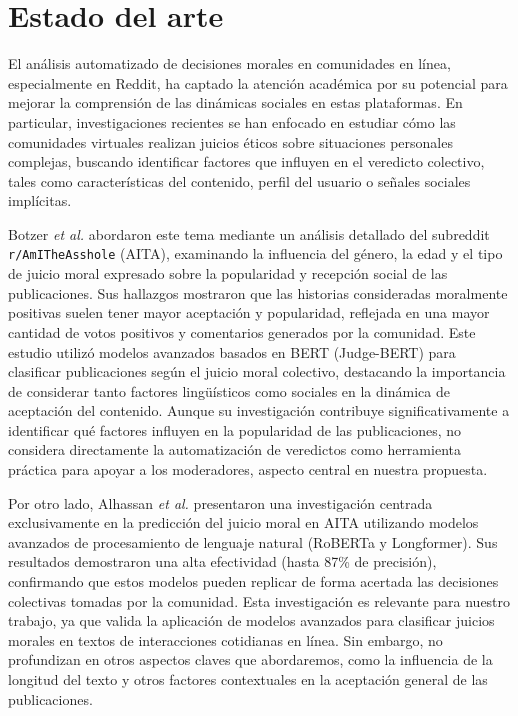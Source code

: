 \section{Estado del arte}

El análisis automatizado de decisiones morales en comunidades en línea, especialmente en Reddit, ha captado la atención académica por su potencial para mejorar la comprensión de las dinámicas sociales en estas plataformas. En particular, investigaciones recientes se han enfocado en estudiar cómo las comunidades virtuales realizan juicios éticos sobre situaciones personales complejas, buscando identificar factores que influyen en el veredicto colectivo, tales como características del contenido, perfil del usuario o señales sociales implícitas.

Botzer \textit{et al.} \cite{botzer2023} abordaron este tema mediante un análisis detallado del subreddit \texttt{r/AmITheAsshole} (AITA), examinando la influencia del género, la edad y el tipo de juicio moral expresado sobre la popularidad y recepción social de las publicaciones. Sus hallazgos mostraron que las historias consideradas moralmente positivas suelen tener mayor aceptación y popularidad, reflejada en una mayor cantidad de votos positivos y comentarios generados por la comunidad. Este estudio utilizó modelos avanzados basados en BERT (Judge-BERT) para clasificar publicaciones según el juicio moral colectivo, destacando la importancia de considerar tanto factores lingüísticos como sociales en la dinámica de aceptación del contenido. Aunque su investigación contribuye significativamente a identificar qué factores influyen en la popularidad de las publicaciones, no considera directamente la automatización de veredictos como herramienta práctica para apoyar a los moderadores, aspecto central en nuestra propuesta.

Por otro lado, Alhassan \textit{et al.} \cite{alhassan2022} presentaron una investigación centrada exclusivamente en la predicción del juicio moral en AITA utilizando modelos avanzados de procesamiento de lenguaje natural (RoBERTa y Longformer). Sus resultados demostraron una alta efectividad (hasta 87\% de precisión), confirmando que estos modelos pueden replicar de forma acertada las decisiones colectivas tomadas por la comunidad. Esta investigación es relevante para nuestro trabajo, ya que valida la aplicación de modelos avanzados para clasificar juicios morales en textos de interacciones cotidianas en línea. Sin embargo, no profundizan en otros aspectos claves que abordaremos, como la influencia de la longitud del texto y otros factores contextuales en la aceptación general de las publicaciones.

